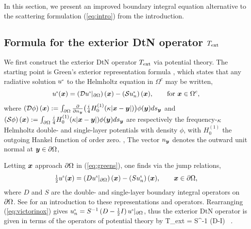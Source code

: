 \documentclass[11pt,final]{amsart}
\theoremstyle{definition}
\numberwithin{remark}{section}
\numberwithin{definition}{section}
\numberwithin{pro}{section}
\begin{document}

In this section, we present an improved
boundary integral equation alternative to the scattering formulation (\ref{eq:intro})
from the introduction.





\subsection{Formula for the exterior DtN operator $T_{\rm ext}$}
\label{sec:formulatText}

We first construct the exterior DtN operator $T_{\rm ext}$
via potential theory. The starting point is
Green's exterior representation formula \cite[Thm.~2.5]{coltonkress},
which states that
any radiative solution $u^{\mbox{\tiny s}}$ to the Helmholtz equation in $\Omega^c$ may be written,
\begin{equation}
u^{\mbox{\tiny s}}(\bm{x}) = \left(\mathcal{D}u^{\mbox{\tiny s}}|_{\partial\Omega} \right)(\bm{x}) - \left(\mathcal{S} u^{\mbox{\tiny s}}_n\right)(\bm{x}),
\qquad\mbox{for}\ \bm{x}\in \Omega^c,
\label{eq:greens}
\end{equation}
where $\left(\mathcal{D}\phi\right)(\bm{x}) := \int_{{\partial\Omega}}\frac{\partial}{\partial n_{\bm{y}}} \bigl(\frac{i}{4}H^{(1)}_0(\kappa|\bm{x}-\bm{y}|)\bigr)\phi(\bm{y})ds_{\bm{y}}$ and
$\left(\mathcal{S}\phi\right)(\bm{x}) :=\int_{{\partial\Omega}} \frac{i}{4}H^{(1)}_0(\kappa|\bm{x}-\bm{y}|) \phi(\bm{y})ds_{\bm{y}}$
are respectively the frequency-$\kappa$ Helmholtz
double- and single-layer potentials with density $\phi$,
with $H^{(1)}_0$ the outgoing Hankel function of order zero. ,
The vector $n_{\bm{y}}$ denotes the outward unit normal at $\bm{y}\in{\partial\Omega}$,

Letting $\bm{x}$ approach ${\partial\Omega}$ in (\ref{eq:greens}), one finds via the jump relations,
\begin{equation}
\label{eq:victorinox}
\mbox{\small $\frac{1}{2}$}u^{\mbox{\tiny s}}(\bm{x}) = \left(D u^{\mbox{\tiny s}}|_{{\partial\Omega}}\right)(\bm{x}) - \left(S u^{\mbox{\tiny s}}_n\right)(\bm{x}),\qquad \bm{x} \in {\partial\Omega},
\end{equation}
where $D$ and $S$ are the double- and single-layer boundary integral operators on ${\partial\Omega}$.
See \cite[Ch.~3.1]{coltonkress} for an introduction to these representations and operators.
Rearranging (\ref{eq:victorinox}) gives
$ u^{\mbox{\tiny s}}_n = S^{-1} \left(D-\mbox{\small $\frac{1}{2}$} I\right)u^{\mbox{\tiny s}}|_{\partial\Omega}$,
thus the exterior DtN operator is given in terms of the operators of potential theory by
\be
T_{\rm ext} = S^{-1} \left(D-\half I\right)
~.
\label{Text}
\ee
\end{document}
